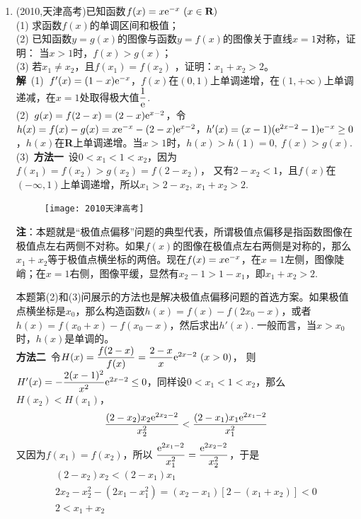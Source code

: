 \begin{enumerate}[label={【\textbf{例\thechapter.\arabic*}】},
 leftmargin=\inteval{\myenumleftmargin}pt,
 itemsep=\inteval{\myenumitempsep}pt,
 itemindent=\inteval{\myenumitemindent}pt]
\item (2010,天津高考)已知函数$ f(x)=x\e^{-x}\ (x\in \textbf{R}) $ \\
(1) 求函数$ f(x) $的单调区间和极值；\\
(2) 已知函数$ y=g(x) $的图像与函数$ y=f(x) $的图像关于直线$ x=1 $对称，证明：
当$ x>1 $时，$ f(x)>g(x) $；\\
(3) 若$ x_1\neq x_2 $，且$ f(x_1)=f(x_2) $ ，证明：$ x_1+x_2>2 $。\\
\textbf{解}\ (1)\ $ f'(x)=(1-x)\mathrm{e}^{-x} $，$ f(x) $在$ (0,1) $上单调递增，在$ (1,+\infty) $上单调递减，在$ x=1 $处取得极大值$ \dfrac{1}{\mathrm{e}} $. \\
(2)\ $ g(x)=f(2-x)=(2-x)\mathrm{e}^{x-2} $，令$ h(x)=f(x)-g(x)=x\mathrm{e}^{-x}-(2-x)\mathrm{e}^{x-2} $，$ h'(x)=(x-1)(\mathrm{e}^{2x-2}-1)\mathrm{e}^{-x}\geq 0 $，$ h(x) $在\textbf{R}上单调递增。当$ x>1 $时，$ h(x)>h(1)=0,\ f(x)>g(x) $. \\
(3)\ \textbf{方法一}\ 设$ 0<x_1<1<x_2 $，因为$ f(x_1)=f(x_2)>g(x_2)=f(2-x_2) $，
又有$ 2-x_2<1 $，且$ f(x) $在$ (-\infty,1) $上单调递增，所以$ x_1>2-x_2,\ x_1+x_2>2 $. \\
\begin{figure}[h]
	\centering
	\texttt{[image: 2010天津高考]}
\end{figure}
\textbf{注}：本题就是“极值点偏移”问题的典型代表，所谓极值点偏移是指函数图像在极值点左右两侧不对称。如果$ f(x) $的图像在极值点左右两侧是对称的，那么$ x_1+x_2 $等于极值点横坐标的两倍。现在$ f(x)=x\mathrm{e}^{-x} $，在$ x=1 $左侧，图像陡峭；在$ x=1 $右侧，图像平缓，显然有$ x_2-1>1-x_1 $，即$ x_1+x_2>2 $. 

本题第(2)和(3)问展示的方法也是解决极值点偏移问题的首选方案。如果极值点横坐标是$ x_0 $，那么构造函数$ h(x)=f(x)-f(2x_0-x) $，或者$ h(x)=f(x_0+x)-f(x_0-x) $，然后求出$ h'(x) $. 一般而言，当$ x>x_0 $时，$ h(x) $是单调的。\\
\textbf{方法二}\ 令$ H(x)=\dfrac{f(2-x)}{f(x)}=\dfrac{2-x}{x}\e^{2x-2}\ (x>0) $，
则$ H'(x)=-\dfrac{2(x-1)^2}{x^2}\mathrm{e}^{2x-2}\leq 0 $，同样设$ 0<x_1<1<x_2 $，那么$ H(x_2)<H(x_1) $，
\begin{gather*}
	\dfrac{(2-x_2)x_2\mathrm{e}^{2x_2-2}}{x_2^2} <
	\dfrac{(2-x_1)x_1\mathrm{e}^{2x_1-2}}{x_1^2} 
\end{gather*}
又因为$ f(x_1)=f(x_2) $，所以	$ \dfrac{\mathrm{e}^{2x_1-2}}{x_1^2}=\dfrac{\mathrm{e}^{2x_2-2}}{x_2^2} $，于是
\begin{gather*}
    (2-x_2)x_2<(2-x_1)x_1 \\
	2x_2-x_2^2-(2x_1-x_1^2)=(x_2-x_1)[2-(x_1+x_2)]< 0 \\
	2<x_1+x_2
\end{gather*} 


\end{enumerate}
